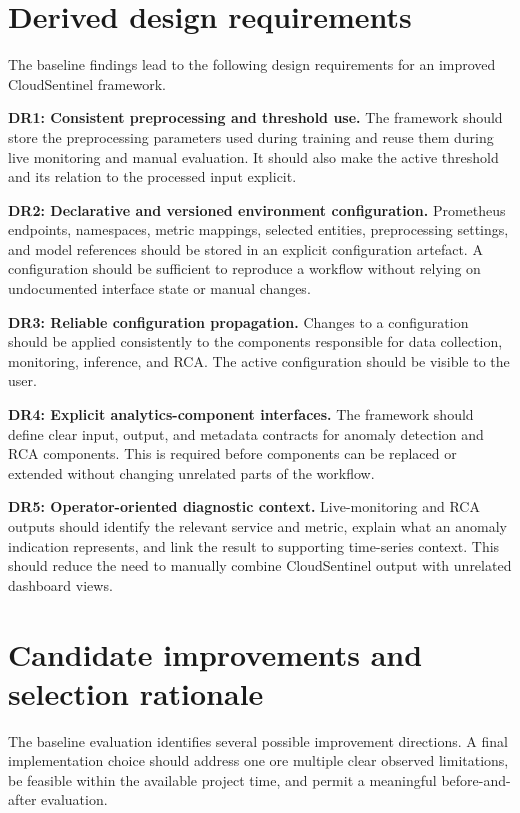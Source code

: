 
\section{Derived design requirements}
The baseline findings lead to the following design requirements for an improved CloudSentinel framework.

\textbf{DR1: Consistent preprocessing and threshold use.}
The framework should store the preprocessing parameters used during training and reuse them during live monitoring and manual evaluation. It should also make the active threshold and its relation to the processed input explicit.

\textbf{DR2: Declarative and versioned environment configuration.} Prometheus endpoints, namespaces, metric mappings, selected entities, preprocessing settings, and model references should be stored in an explicit configuration artefact. A configuration should be sufficient to reproduce a workflow without relying on undocumented interface state or manual changes.

\textbf{DR3: Reliable configuration propagation.} Changes to a configuration should be applied consistently to the components responsible for data collection, monitoring, inference, and RCA. The active configuration should be visible to the user.

\textbf{DR4: Explicit analytics-component interfaces.} The framework should define clear input, output, and metadata contracts for anomaly detection and RCA components. This is required before components can be replaced or extended without changing unrelated parts of the workflow.

\textbf{DR5: Operator-oriented diagnostic context.} Live-monitoring and RCA outputs should identify the relevant service and metric, explain what an anomaly indication represents, and link the result to supporting time-series context. This should reduce the need to manually combine CloudSentinel output with unrelated dashboard views.

\section{Candidate improvements and selection rationale}
The baseline evaluation identifies several possible improvement directions. A final implementation choice should address one ore multiple clear observed limitations, be feasible within the available project time, and permit a meaningful before-and-after evaluation.

